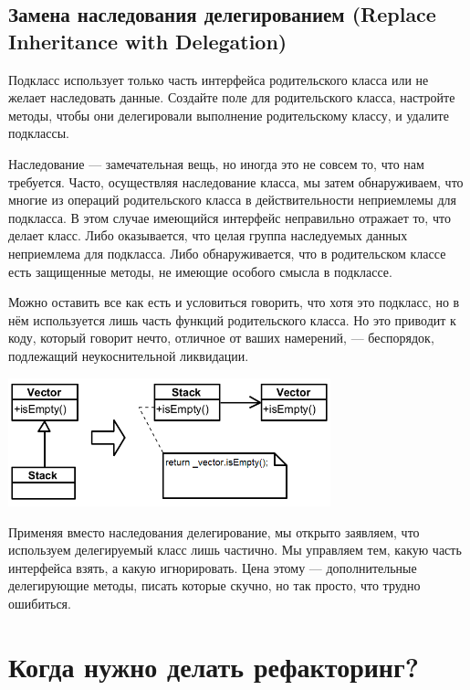 \documentclass{../../text-style}
\begin{document}
\subsection{Замена наследования делегированием (Replace Inheritance with Delegation)}

Подкласс использует только часть интерфейса родительского класса или не желает наследовать данные. Создайте поле для родительского класса, настройте методы, чтобы они делегировали выполнение родительскому классу, и удалите подклассы.

Наследование --- замечательная вещь, но иногда это не совсем то, что нам требуется. Часто, осуществляя наследование класса, мы затем обнаруживаем, что многие из операций родительского класса в действительности неприемлемы для подкласса. В этом случае имеющийся интерфейс неправильно отражает то, что делает класс. Либо оказывается, что целая группа наследуемых данных неприемлема для подкласса. Либо обнаруживается, что в родительском классе есть защищенные методы, не имеющие особого смысла в подклассе.

Можно оставить все как есть и условиться говорить, что хотя это подкласс, но в нём используется лишь часть функций родительского класса. Но это приводит к коду, который говорит нечто, отличное от ваших намерений, --- беспорядок, подлежащий неукоснительной ликвидации.

\begin{center}
    \includegraphics[width=0.7\textwidth]{replaceInheritanceWithDelegation.png}
\end{center}

Применяя вместо наследования делегирование, мы открыто заявляем, что используем делегируемый класс лишь частично. Мы управляем тем, какую часть интерфейса взять, а какую игнорировать. Цена этому --- дополнительные делегирующие методы, писать которые скучно, но так просто, что трудно ошибиться.

\section{Когда нужно делать рефакторинг?}
\end{document}
